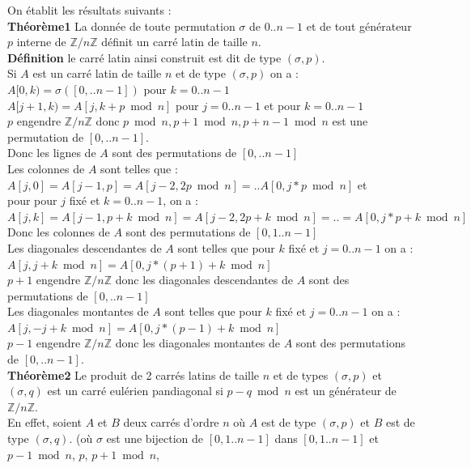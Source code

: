 \documentclass[a4paper,11pt]{book}
\newcommand{\Z}{{\mathbb{Z}}}
\begin{document}
On \'etablit les r\'esultats suivants :\\
{\bf Th\'eor\`eme1}
La donn\'ee de toute permutation $\sigma$ de $0..n-1$ et de tout g\'en\'erateur
$p$ interne de $\Z/n\Z$ d\'efinit un carr\'e latin de taille $n$.\\
{\bf D\'efinition} le carr\'e latin ainsi construit est dit de type 
$(\sigma, p)$.\\
Si $A$ est un carr\'e latin de taille $n$ et de type $(\sigma, p)$ on a :\\
$A[0,k)=\sigma([0,..n-1])$ pour $k=0..n-1$\\
$A[j+1,k)=A[j,k+p \bmod n]$ pour $j=0..n-1$ et pour $k=0..n-1$\\
$p$ engendre $\Z/n\Z$ donc $p \bmod n, p+1 \bmod n, p+n-1 \bmod n$ est une 
permutation de $[0,..n-1]$.\\
Donc les lignes de $A$ sont des permutations de $[0,..n-1]$\\
Les colonnes de $A$ sont telles que :\\
$A[j,0]=A[j-1,p]=A[j-2,2p \bmod n]=..A[0,j*p\bmod n]$ et \\
pour pour $j$ fix\'e et $k=0..n-1$, on a :\\
$A[j,k]=A[j-1,p+k\bmod n]=A[j-2,2p+k\bmod n]=..=A[0,j*p+k\bmod n]$\\
Donc les colonnes de $A$ sont des permutations de $[0,1..n-1]$\\
Les diagonales descendantes de $A$ sont telles que pour $k$ fix\'e  et
$j=0..n-1$ on a :\\
$A[j,j+k\bmod n]=A[0,j*(p+1)+k\bmod n]$\\
$p+1$ engendre $\Z/n\Z$ donc les diagonales descendantes de $A$ sont des 
permutations de $[0,..n-1]$\\
Les diagonales montantes de $A$ sont telles que  pour $k$ fix\'e  et
$j=0..n-1$ on a :\\
$A[j,-j+k\bmod n]=A[0,j*(p-1)+k\bmod n]$\\
$p-1$ engendre $\Z/n\Z$ donc les diagonales montantes de $A$ sont des 
permutations de $[0,..n-1]$.\\
{\bf Th\'eor\`eme2} Le produit de 2 carr\'es latins de taille $n$ et de types
$(\sigma, p)$ et $(\sigma, q)$ est un carr\'e eul\'erien pandiagonal si 
$p-q \bmod n$ est un g\'en\'erateur de  $\Z/n\Z$.\\
En effet, soient $A$ et $B$ deux carr\'es d'ordre $n$ o\`u $A$ est de type  
$(\sigma, p)$ et $B$ est de type $(\sigma, q)$. (o\`u $\sigma$ est une 
bijection de $[0,1..n-1]$ dans $[0,1..n-1]$ et $p-1\bmod n$, $p$, $p+1\bmod n$,
\end{document}
